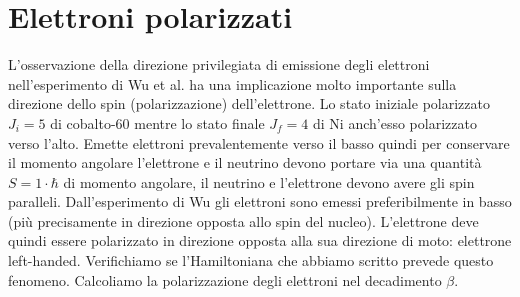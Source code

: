 \section{Elettroni polarizzati}
L'osservazione della direzione privilegiata di emissione degli elettroni nell'esperimento di Wu et al. ha una implicazione molto importante sulla direzione dello spin (polarizzazione) dell'elettrone. Lo stato iniziale polarizzato $J_i=5$ di cobalto-60 mentre lo stato finale $J_f=4$ di Ni anch'esso polarizzato verso l'alto. Emette elettroni prevalentemente verso il basso quindi per conservare il momento angolare l'elettrone e il neutrino devono portare via una quantità $S=1\cdot\hbar$ di momento angolare, il neutrino e l'elettrone devono avere gli spin paralleli. Dall'esperimento di Wu gli elettroni sono emessi preferibilmente in basso (più precisamente in direzione opposta allo spin del nucleo). L'elettrone deve quindi essere polarizzato in direzione opposta alla sua direzione di moto: elettrone left-handed. Verifichiamo se l'Hamiltoniana che abbiamo scritto prevede questo fenomeno. Calcoliamo la polarizzazione degli elettroni nel decadimento $\beta$.
